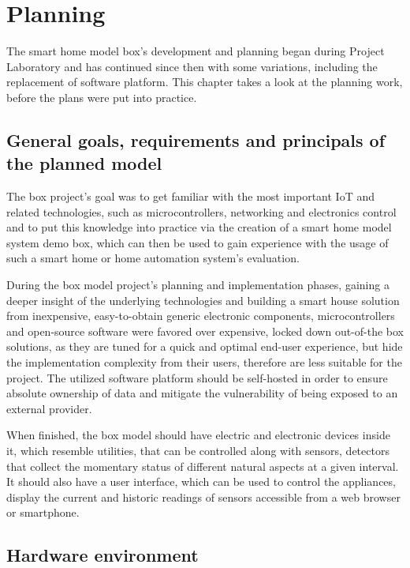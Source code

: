 \chapter{Planning}

The smart home model box's development and planning began during Project Laboratory and has continued since then with some variations, including the replacement of software platform. This chapter takes a look at the planning work, before the plans were put into practice.

\section{General goals, requirements and principals of the planned model}

The box project's goal was to get familiar with the most important IoT and related technologies, such as microcontrollers, networking and electronics control and to put this knowledge into practice via the creation of a smart home model system demo box, which can then be used to gain experience with the usage of such a smart home or home automation system's evaluation.

During the box model project's planning and implementation phases, gaining a deeper insight of the underlying technologies and building a smart house solution from inexpensive, easy-to-obtain generic electronic components, microcontrollers and open-source software were favored over expensive, locked down out-of-the box solutions, as they are tuned for a quick and optimal end-user experience, but hide the implementation complexity from their users, therefore are less suitable for the project. The utilized software platform should be self-hosted in order to ensure absolute ownership of data and mitigate the vulnerability of being exposed to an external provider.

When finished, the box model should have electric and electronic devices inside it, which resemble utilities, that can be controlled along with sensors, detectors that collect the momentary status of different natural aspects at a given interval. It should also have a user interface, which can be used to control the appliances, display the current and historic readings of sensors accessible from a web browser or smartphone.

\section{Hardware environment}


